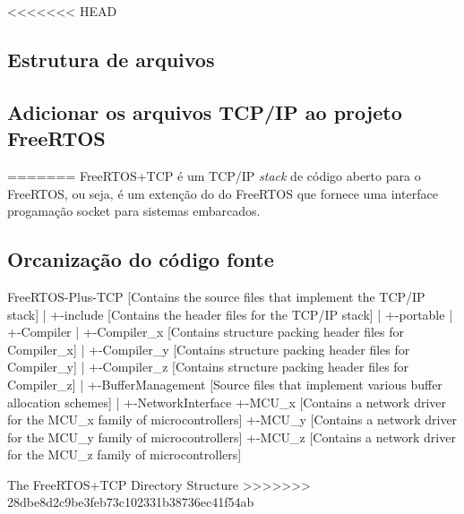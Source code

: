 <<<<<<< HEAD
\subsection{Estrutura de arquivos}


\subsection{Adicionar os arquivos TCP/IP ao projeto FreeRTOS}

=======
FreeRTOS+TCP é um TCP/IP \textit{stack} de código aberto para o FreeRTOS, ou seja, é um extenção do do FreeRTOS que fornece uma interface progamação 
socket para sistemas embarcados.

\subsection{Orcanização do código fonte}

FreeRTOS-Plus-TCP        [Contains the source files that implement the TCP/IP stack]
  |
  +-include              [Contains the header files for the TCP/IP stack]
  |
  +-portable
      |
      +-Compiler
      |   +-Compiler_x   [Contains structure packing header files for Compiler_x]
      |   +-Compiler_y   [Contains structure packing header files for Compiler_y]
      |   +-Compiler_z   [Contains structure packing header files for Compiler_z]
      |
      +-BufferManagement [Source files that implement various buffer allocation schemes]
      |
      +-NetworkInterface
          +-MCU_x        [Contains a network driver for the MCU_x family of microcontrollers]
          +-MCU_y        [Contains a network driver for the MCU_y family of microcontrollers]
          +-MCU_z        [Contains a network driver for the MCU_z family of microcontrollers]

The FreeRTOS+TCP Directory Structure
>>>>>>> 28dbe8d2c9be3feb73c102331b38736ec41f54ab
